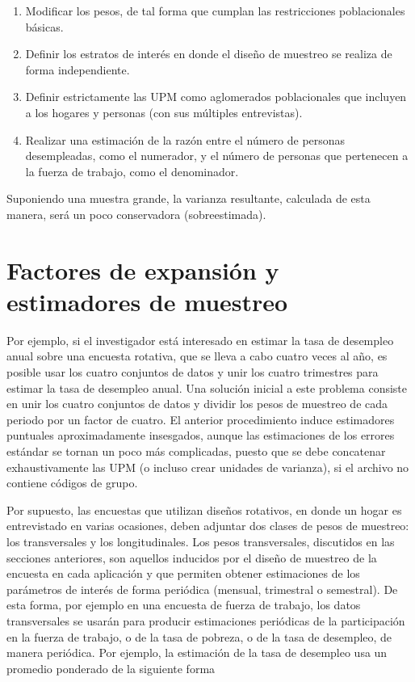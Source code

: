 \documentclass[
  10pt,
  spanish,
]{book}
\providecommand{\tightlist}{%
  \setlength{\itemsep}{0pt}\setlength{\parskip}{0pt}}
\begin{document}
\begin{enumerate}
\def\labelenumi{\arabic{enumi}.}
\tightlist
\item
  Modificar los pesos, de tal forma que cumplan las restricciones
  poblacionales básicas.
\item
  Definir los estratos de interés en donde el diseño de muestreo se
  realiza de forma independiente.
\item
  Definir estrictamente las UPM como aglomerados poblacionales que
  incluyen a los hogares y personas (con sus múltiples entrevistas).
\item
  Realizar una estimación de la razón entre el número de personas
  desempleadas, como el numerador, y el número de personas que
  pertenecen a la fuerza de trabajo, como el denominador.
\end{enumerate}

Suponiendo una muestra grande, la varianza resultante, calculada de esta
manera, será un poco conservadora (sobreestimada).

\hypertarget{factores-de-expansiuxf3n-y-estimadores-de-muestreo}{%
\section{Factores de expansión y estimadores de muestreo}\label{factores-de-expansiuxf3n-y-estimadores-de-muestreo}}

Por ejemplo, si el investigador está interesado en estimar la tasa de
desempleo anual sobre una encuesta rotativa, que se lleva a cabo cuatro
veces al año, es posible usar los cuatro conjuntos de datos y unir los
cuatro trimestres para estimar la tasa de desempleo anual. Una solución
inicial a este problema consiste en unir los cuatro conjuntos de datos y
dividir los pesos de muestreo de cada periodo por un factor de cuatro.
El anterior procedimiento induce estimadores puntuales aproximadamente
insesgados, aunque las estimaciones de los errores estándar se tornan un
poco más complicadas, puesto que se debe concatenar exhaustivamente las
UPM (o incluso crear unidades de varianza), si el archivo no contiene
códigos de grupo.

Por supuesto, las encuestas que utilizan diseños rotativos, en donde un
hogar es entrevistado en varias ocasiones, deben adjuntar dos clases de
pesos de muestreo: los transversales y los longitudinales. Los pesos
transversales, discutidos en las secciones anteriores, son aquellos
inducidos por el diseño de muestreo de la encuesta en cada aplicación y
que permiten obtener estimaciones de los parámetros de interés de forma
periódica (mensual, trimestral o semestral). De esta forma, por ejemplo
en una encuesta de fuerza de trabajo, los datos transversales se usarán
para producir estimaciones periódicas de la participación en la fuerza
de trabajo, o de la tasa de pobreza, o de la tasa de desempleo, de
manera periódica. Por ejemplo, la estimación de la tasa de desempleo usa
un promedio ponderado de la siguiente forma
\end{document}

